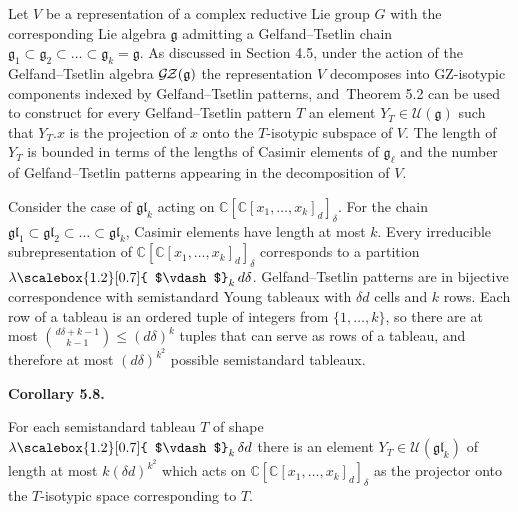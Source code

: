 Let $V$ be a representation of a complex reductive Lie group $G$ with the corresponding Lie algebra $\mathfrak{g}$ admitting a Gelfand–Tsetlin chain $\mathfrak{g}_{1}\subset\mathfrak{g}_{2}\subset\dots\subset\mathfrak{g}_{k}=\mathfrak{g}$.
As discussed in Section 4.5, under the action of the Gelfand–Tsetlin algebra $\mathcal{G}\hskip-1.00006pt\mathcal{Z}(\mathfrak{g})$ the representation $V$ decomposes into GZ-isotypic components indexed by Gelfand–Tsetlin patterns, and Theorem 5.2 can be used to construct for every Gelfand–Tsetlin pattern $T$ an element $Y_{T}\in\mathcal{U}(\mathfrak{g})$ such that $Y_{T}.x$ is the projection of $x$ onto the $T$-isotypic subspace of $V$.
The length of $Y_{T}$ is bounded in terms of the lengths of Casimir elements of $\mathfrak{g}_{\ell}$ and the number of Gelfand–Tsetlin patterns appearing in the decomposition of $V$.





Consider the case of $\mathfrak{gl}_{k}$ acting on $\mathbb{C}[\mathbb{C}[x_{1},\dots,x_{k}]_{d}]_{\delta}$.
For the chain $\mathfrak{gl}_{1}\subset\mathfrak{gl}_{2}\subset\dots\subset\mathfrak{gl}_{k}$, Casimir elements have length at most $k$.
Every irreducible subrepresentation of $\mathbb{C}[\mathbb{C}[x_{1},\dots,x_{k}]_{d}]_{\delta}$ corresponds to a partition $\lambda\mathchoice{\scalebox{1.2}[0.7]{ $\vdash$}_{k}\,}{\scalebox{1.2}[0.7]{ $\vdash$}_{k}\,}{\scalebox{0.7}{\scalebox{1.2}[0.7]{$\vdash$}}_{k}\,}{\scalebox{0.5}{\scalebox{1.2}[0.7]{$\vdash$}}_{k}\,}{d\delta}$.
Gelfand–Tsetlin patterns are in bijective correspondence with semistandard Young tableaux with $\delta d$ cells and $k$ rows.
Each row of a tableau is an ordered tuple of integers from $\{1,\dots,k\}$, so there are at most $\binom{d\delta+k-1}{k-1}\leq(d\delta)^{k}$ tuples that can serve as rows of a tableau, and therefore at most $(d\delta)^{k^{2}}$ possible semistandard tableaux.





\par\medskip\noindent\textbf{Corollary 5.8.}\par



For each semistandard tableau $T$ of shape $\lambda\mathchoice{\scalebox{1.2}[0.7]{ $\vdash$}_{k}\,}{\scalebox{1.2}[0.7]{ $\vdash$}_{k}\,}{\scalebox{0.7}{\scalebox{1.2}[0.7]{$\vdash$}}_{k}\,}{\scalebox{0.5}{\scalebox{1.2}[0.7]{$\vdash$}}_{k}\,}{\delta d}$ there is an element $Y_{T}\in\mathcal{U}(\mathfrak{gl}_{k})$ of length at most $k(\delta d)^{k^{2}}$ which acts on $\mathbb{C}[\mathbb{C}[x_{1},\ldots,x_{k}]_{d}]_{\delta}$ as the projector onto the $T$-isotypic space corresponding to $T$.








